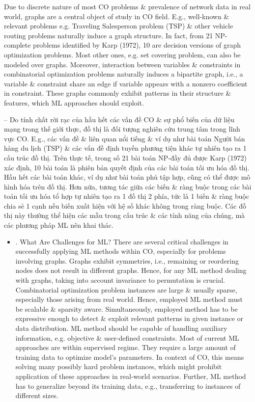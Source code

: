 \documentclass{article}
\begin{document}
\begin{itemize}
   Due to discrete nature of most CO problems \& prevalence of network data in real world, graphs are a central object of study in CO field. E.g., well-known \& relevant problems e.g. Traveling Salesperson problem (TSP) \& other vehicle routing problems naturally induce a graph structure. In fact, from 21 NP-complete problems identified by Karp (1972), 10 are decision versions of graph optimization problems. Most other ones, e.g. set covering problem, can also be modeled over graphs. Moreover, interaction between variables \& constraints in combinatorial optimization problems naturally induces a bipartite graph, i.e., a variable \& constraint share an edge if variable appears with a nonzero coefficient in constraint. These graphs commonly exhibit patterns in their structure \& features, which ML approaches should exploit.

   -- Do tính chất rời rạc của hầu hết các vấn đề CO \& sự phổ biến của dữ liệu mạng trong thế giới thực, đồ thị là đối tượng nghiên cứu trung tâm trong lĩnh vực CO. E.g., các vấn đề \& liên quan nổi tiếng \& ví dụ như bài toán Người bán hàng du lịch (TSP) \& các vấn đề định tuyến phương tiện khác tự nhiên tạo ra 1 cấu trúc đồ thị. Trên thực tế, trong số 21 bài toán NP-đầy đủ được Karp (1972) xác định, 10 bài toán là phiên bản quyết định của các bài toán tối ưu hóa đồ thị. Hầu hết các bài toán khác, ví dụ như bài toán phủ tập hợp, cũng có thể được mô hình hóa trên đồ thị. Hơn nữa, tương tác giữa các biến \& ràng buộc trong các bài toán tối ưu hóa tổ hợp tự nhiên tạo ra 1 đồ thị 2 phía, tức là 1 biến \& ràng buộc chia sẻ 1 cạnh nếu biến xuất hiện với hệ số khác không trong ràng buộc. Các đồ thị này thường thể hiện các mẫu trong cấu trúc \& các tính năng của chúng, mà các phương pháp ML nên khai thác.
    \begin{itemize}
        \item {. What Are Challenges for ML?} There are several critical challenges in successfully applying ML methods within CO, especially for problems involving graphs. Graphs exhibit symmetries, i.e., remaining or reordering nodes does not result in different graphs. Hence, for any ML method dealing with graphs, taking into account invariance to permutation is crucial. Combinatorial optimization problem instances are large \& usually sparse, especially those arising from real world. Hence, employed ML method must be scalable \& sparsity aware.  Simultaneously, employed method has to be expressive enough to detect \& exploit relevant patterns in given instance or data distribution. ML method should be capable of handling auxiliary information, e.g. objective \& user-defined constraints. Most of current ML approaches are within supervised regime. They require a large amount of training data to optimize model's parameters. In context of CO, this means solving many possibly hard problem instances, which might prohibit application of these approaches in real-world scenarios. Further, ML method has to generalize beyond its training data, e.g., transferring to instances of different sizes.


\end{itemize}
\end{itemize}
\end{document}
